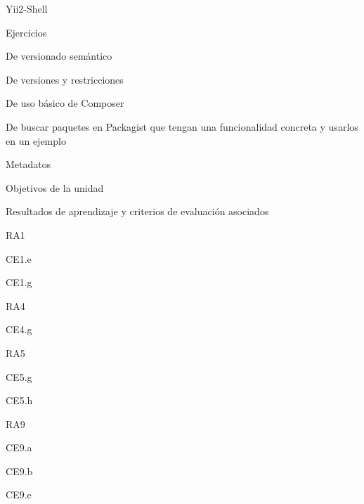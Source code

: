 \begin{longenum}
\begin{longenum}
\begin{longenum}
            \item Yii2-Shell
        \end{longenum}
        \item Ejercicios
        \begin{longenum}
            \item De versionado semántico
            \item De versiones y restricciones
            \item De uso básico de Composer
            \item De buscar paquetes en Packagist que tengan una funcionalidad concreta y usarlos en un ejemplo
        \end{longenum}
        \item Metadatos
        \begin{longenum}
            \item Objetivos de la unidad
            \item Resultados de aprendizaje y criterios de evaluación asociados
            \begin{longenum}
                \item RA1
                \begin{longenum}
                    \item CE1.e
                    \item CE1.g
                \end{longenum}
                \item RA4
                \begin{longenum}
                    \item CE4.g
                \end{longenum}
                \item RA5
                \begin{longenum}
                    \item CE5.g
                    \item CE5.h
                \end{longenum}
                \item RA9
                \begin{longenum}
                    \item CE9.a
                    \item CE9.b
                    \item CE9.e
                \end{longenum}
            \end{longenum}

\end{longenum}
\end{longenum}
\end{longenum}
